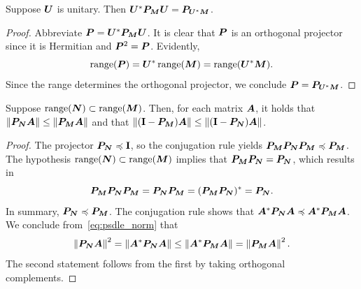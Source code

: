 \documentclass[final]{siamltex}
\begin{document}



\lsp

\begin{proposition} \label{prop:conj-proj}
Suppose $\bm{U}$ is unitary.  Then $\bm{U}^*
\bm{P}_{\bm{M}} \bm{U} = \bm{P}_{\bm{U}^* \bm{M}}$.
\end{proposition}

\lsp

\begin{proof}
Abbreviate $\bm{P} = \bm{U}^* \bm{P}_{\bm{M}} \bm{U}$. It is
clear that $\bm{P}$ is an orthogonal projector since it is Hermitian
and $\bm{P}^{2} = \bm{P}$. Evidently,
$$
\operatorname{range}(\bm{P}) = \bm{U}^* \operatorname{range}(\bm{M}) =
\operatorname{range}(\bm{U}^* \bm{M}).
$$
Since the range determines the orthogonal projector, we
conclude $\bm{P} = \bm{P}_{\bm{U}^* \bm{M}}$.
\end{proof}

\lsp

\begin{proposition} \label{prop:proj-range}
Suppose $\operatorname{range}(\bm{N}) \subset \operatorname{range}(\bm{M})$.  Then, for
each matrix $\bm{A}$, it holds that $ \left\Vert {\bm{P}_{\bm{N}}
\bm{A}} \right\Vert \leq \left\Vert {\bm{P}_{\bm{M}} \bm{A}} \right\Vert$ and that
$\left\Vert {(\mathbf{I}- \bm{P}_{\bm{M}}) \bm{A}} \right\Vert
    \leq \left\Vert {(\mathbf{I}- \bm{P}_{\bm{N}}) \bm{A}} \right\Vert$.
\end{proposition}

\lsp

\begin{proof}
The projector $\bm{P}_{\bm{N}} \preccurlyeq \mathbf{I}$, so the conjugation
rule yields
$\bm{P}_{\bm{M}}\bm{P}_{\bm{N}}\bm{P}_{\bm{M}} \preccurlyeq
\bm{P}_{\bm{M}}$.  The hypothesis $\operatorname{range}(\bm{N}) \subset
\operatorname{range}(\bm{M})$ implies that $\bm{P}_{\bm{M}} \bm{P}_{\bm{N}}
= \bm{P}_{\bm{N}}$, which results in
$$
\bm{P}_{\bm{M}} \bm{P}_{\bm{N}} \bm{P}_{\bm{M}}
    = \bm{P}_{\bm{N}} \bm{P}_{\bm{M}}
    = (\bm{P}_{\bm{M}} \bm{P}_{\bm{N}})^*
    = \bm{P}_{\bm{N}}.
$$
In summary, $\bm{P}_{\bm{N}} \preccurlyeq \bm{P}_{\bm{M}}$.
The conjugation rule shows that $\bm{A}^*
\bm{P}_{\bm{N}} \bm{A} \preccurlyeq \bm{A}^* \bm{P}_{\bm{M}}
\bm{A}$.  We conclude from~\eqref{eq:psdle_norm} that
$$
\left\Vert { \bm{P}_{\bm{N}} \bm{A} } \right\Vert^2
    = \left\Vert { \bm{A}^*\bm{P}_{\bm{N}} \bm{A} } \right\Vert
    \leq \left\Vert { \bm{A}^*\bm{P}_{\bm{M}} \bm{A} } \right\Vert
    = \left\Vert { \bm{P}_{\bm{M}} \bm{A} } \right\Vert^2.
$$
The second statement follows from the first by taking orthogonal
complements.
\end{proof}
\end{document}

